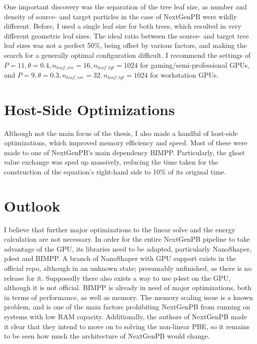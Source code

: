 One important discovery was the separation of the tree leaf size, as number and density of source- and target particles in the case of NextGenPB were wildly different.
Before, I used a single leaf size for both trees, which resulted in very different geometric leaf sizes.
The ideal ratio between the source- and target tree leaf sizes was not a perfect 50\%, being offset by various factors, and making the search for a generally optimal configuration difficult.
I recommend the settings of $P = 11, \theta = 0.4, n_{leaf,src} = 16, n_{leaf,tgt} = 1024$ for gaming/semi-professional GPUs, and $P = 9, \theta = 0.3, n_{leaf,src} = 32, n_{leaf,tgt} = 1024$ for workstation GPUs.

\section{Host-Side Optimizations}

Although not the main focus of the thesis, I also made a handful of host-side optimizations, which improved memory efficiency and speed.
Most of these were made to one of NextGenPB's main dependency BIMPP.
Particularly, the ghost value exchange was sped up massively, reducing the time taken for the construction of the equation's right-hand side to 10\% of its original time.

\section{Outlook}

I believe that further major optimizations to the linear solve and the energy calculation are not necessary.
In order for the entire NextGenPB pipeline to take advantage of the GPU, its libraries need to be adapted, particularly NanoShaper, p4est and BIMPP.
A branch of NanoShaper with GPU support exists in the official repo, although in an unknown state; presumably unfinished, as there is no release for it.
Supposedly there also exists a way to use p4est on the GPU, although it is not official.
BIMPP is already in need of major optimizations, both in terms of performance, as well as memory.
The memory scaling issue is a known problem, and is one of the main factors prohibiting NextGenPB from running on systems with low RAM capacity.
Additionally, the authors of NextGenPB made it clear that they intend to move on to solving the non-linear PBE, so it remains to be seen how much the architecture of NextGenPB would change.